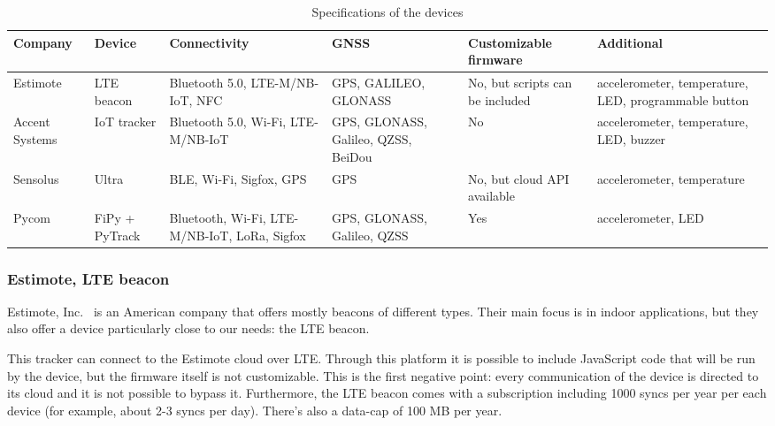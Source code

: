 \begin{table}[htbp]
\centering
{}
\begin{tabularx}{\textwidth}{YYYYYY}
\toprule
\textbf{Company}        & \textbf{Device}         & \textbf{Connectivity}                                                          & \textbf{GNSS}                                & \textbf{Customizable firmware}           & \textbf{Additional}                                           \\ \midrule
Estimote       & LTE beacon     & Bluetooth 5.0, LTE-M/NB-IoT, NFC                                      & GPS, GALILEO, GLONASS               & No, but scripts can be included & accelerometer, temperature, LED, programmable button \\ \midrule
Accent Systems & IoT tracker    & Bluetooth 5.0, Wi-Fi, LTE-M/NB-IoT                                    & GPS, GLONASS, Galileo, QZSS, BeiDou & No                              & accelerometer, temperature, LED, buzzer              \\ \midrule
Sensolus       & Ultra          & BLE, Wi-Fi, Sigfox, GPS                                               & GPS                                 & No, but cloud API available     & accelerometer, temperature                           \\ \midrule
Pycom          & FiPy + PyTrack & Bluetooth, Wi-Fi, LTE-M/NB-IoT, LoRa, Sigfox & GPS, GLONASS, Galileo, QZSS         & Yes                             & accelerometer, LED                                   \\ \bottomrule
\end{tabularx}
\caption{Specifications of the devices}
\label{table_devices}
\end{table}

\subsubsection{Estimote, LTE beacon}
Estimote, Inc.~\cite{estimote} is an American company that offers mostly beacons of different types. Their main focus is in indoor applications, but they also offer a device particularly close to our needs: the LTE beacon.

This tracker can connect to the Estimote cloud over LTE. Through this platform it is possible to include JavaScript code that will be run by the device, but the firmware itself is not customizable. This is the first negative point: every communication of the device is directed to its cloud and it is not possible to bypass it. Furthermore, the LTE beacon comes with a subscription including 1000 syncs per year per each device (for example, about 2-3 syncs per day). There’s also a data-cap of 100 MB per year.

